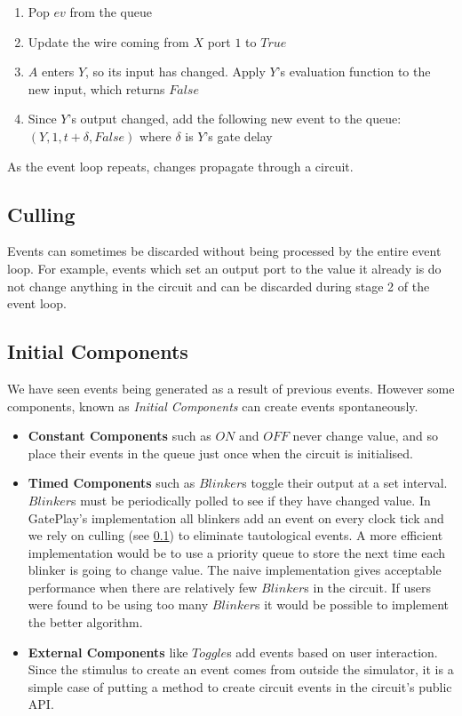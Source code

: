 \begin{enumerate}
	\item Pop $ev$ from the queue
	\item Update the wire coming from $X$ port $1$ to $True$
	\item $A$ enters $Y$, so its input has changed. Apply $Y$'s evaluation function to the new input, which returns $False$
	\item Since $Y$'s output changed, add the following new event to the queue: $(Y, 1, t + \delta, False)$ where $\delta$ is $Y$'s gate delay
\end{enumerate}

As the event loop repeats, changes propagate through a circuit.

\subsection{Culling}
\label{subsec:culling}
Events can sometimes be discarded without being processed by the entire event loop. For example, events which set an output port to the value it already is do not change anything in the circuit and can be discarded during stage 2 of the event loop.

\subsection{Initial Components}
We have seen events being generated as a result of previous events. However some components, known as \textit{Initial Components} can create events spontaneously.

\begin{itemize}
	\item \textbf{Constant Components} such as $ON$ and $OFF$ never change value, and so place their events in the queue just once when the circuit is initialised.
	\item \textbf{Timed Components} such as $Blinker$s toggle their output at a set interval. $Blinker$s must be periodically polled to see if they have changed value. In GatePlay's implementation all blinkers add an event on every clock tick and we rely on culling (see \ref{subsec:culling}) to eliminate tautological events. A more efficient implementation would be to use a priority queue to store the next time each blinker is going to change value. The naive implementation gives acceptable performance when there are relatively few $Blinker$s in the circuit. If users were found to be using too many $Blinker$s it would be possible to implement the better algorithm.
	
	\item \textbf{External Components} like $Toggle$s add events based on user interaction. Since the stimulus to create an event comes from outside the simulator, it is a simple case of putting a method to create circuit events in the circuit's public API.
\end{itemize}

